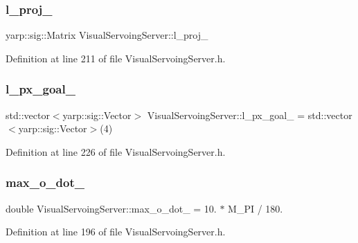 \subsubsection{\texorpdfstring{l\+\_\+proj\+\_\+}{l\_proj\_}}
{\footnotesize\ttfamily yarp\+::sig\+::\+Matrix Visual\+Servoing\+Server\+::l\+\_\+proj\+\_\+\hspace{0.3cm}{\ttfamily [private]}}



Definition at line 211 of file Visual\+Servoing\+Server.\+h.

\mbox{\label{classVisualServoingServer_a3f7efc9e5a4bbb030a4dd81030643398}} 
\subsubsection{\texorpdfstring{l\+\_\+px\+\_\+goal\+\_\+}{l\_px\_goal\_}}
{\footnotesize\ttfamily std\+::vector$<$yarp\+::sig\+::\+Vector$>$ Visual\+Servoing\+Server\+::l\+\_\+px\+\_\+goal\+\_\+ = std\+::vector$<$yarp\+::sig\+::\+Vector$>$(4)\hspace{0.3cm}{\ttfamily [private]}}



Definition at line 226 of file Visual\+Servoing\+Server.\+h.

\mbox{\label{classVisualServoingServer_a2fb091edd86b425b79b36c968a0929e1}} 
\subsubsection{\texorpdfstring{max\+\_\+o\+\_\+dot\+\_\+}{max\_o\_dot\_}}
{\footnotesize\ttfamily double Visual\+Servoing\+Server\+::max\+\_\+o\+\_\+dot\+\_\+ = 10. $\ast$ M\+\_\+\+PI / 180.\hspace{0.3cm}{\ttfamily [private]}}



Definition at line 196 of file Visual\+Servoing\+Server.\+h.

